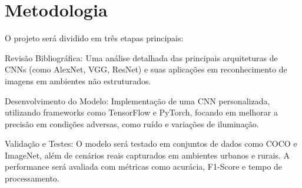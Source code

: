 \section{Metodologia}
O projeto será dividido em três etapas principais:

Revisão Bibliográfica: Uma análise detalhada das principais arquiteturas de CNNs (como AlexNet, VGG, ResNet) e suas aplicações em reconhecimento de imagens em ambientes não estruturados.

Desenvolvimento do Modelo: Implementação de uma CNN personalizada, utilizando frameworks como TensorFlow e PyTorch, focando em melhorar a precisão em condições adversas, como ruído e variações de iluminação.

Validação e Testes: O modelo será testado em conjuntos de dados como COCO e ImageNet, além de cenários reais capturados em ambientes urbanos e rurais. A performance será avaliada com métricas como acurácia, F1-Score e tempo de processamento.